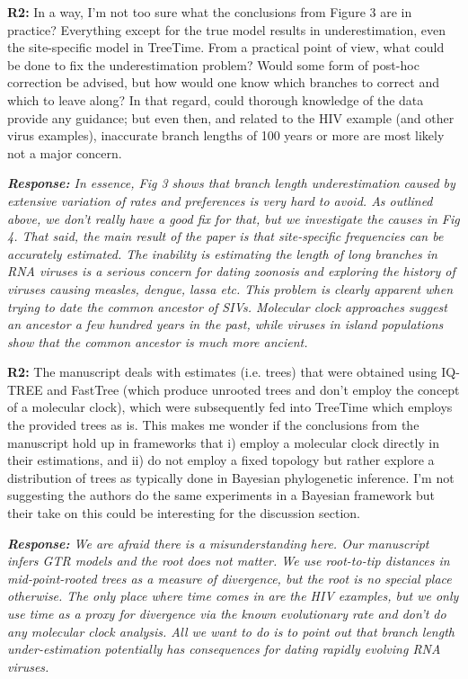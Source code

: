 \documentclass[aps,rmp,onecolumn]{revtex4-1}
\newcommand{\refb}[1]{\textbf{R2:} #1}
\newcommand{\response}[1]{{\it {\color{response}\textbf{Response:} #1}}}
\begin{document}
\refb{In a way, I’m not too sure what the conclusions from Figure 3 are in practice? Everything except for the true model results in underestimation, even the site-specific model in TreeTime. From a practical point of view, what could be done to fix the underestimation problem? Would some form of post-hoc correction be advised, but how would one know which branches to correct and which to leave along? In that regard, could thorough knowledge of the data provide any guidance; but even then, and related to the HIV example (and other virus examples), inaccurate branch lengths of 100 years or more are most likely not a major concern.}

\response{In essence, Fig 3 shows that branch length underestimation caused by extensive variation of rates and preferences is very hard to avoid.
As outlined above, we don't really have a good fix for that, but we investigate the causes in Fig 4.
That said, the main result of the paper is that site-specific frequencies can be accurately estimated.
The inability is estimating the length of long branches in RNA viruses is a serious concern for dating zoonosis and exploring the history of viruses causing measles, dengue, lassa etc.
This problem is clearly apparent when trying to date the common ancestor of SIVs.
Molecular clock approaches suggest an ancestor a few hundred years in the past, while viruses in island populations show that the common ancestor is much more ancient.
}



\refb{The manuscript deals with estimates (i.e. trees) that were obtained using IQ-TREE and FastTree (which produce unrooted trees and don’t employ the concept of a molecular clock), which were subsequently fed into TreeTime which employs the provided trees as is. This makes me wonder if the conclusions from the manuscript hold up in frameworks that i) employ a molecular clock directly in their estimations, and ii) do not employ a fixed topology but rather explore a distribution of trees as typically done in Bayesian phylogenetic inference. I’m not suggesting the authors do the same experiments in a Bayesian framework but their take on this could be interesting for the discussion section.}

\response{
We are afraid there is a misunderstanding here.
Our manuscript infers GTR models and the root does not matter.
We use root-to-tip distances in mid-point-rooted trees as a measure of divergence, but the root is no special place otherwise.
The only place where time comes in are the HIV examples, but we only use time as a proxy for divergence via the known evolutionary rate and don't do any molecular clock analysis.
All we want to do is to point out that branch length under-estimation potentially has consequences for dating rapidly evolving RNA viruses.}
\end{document}
